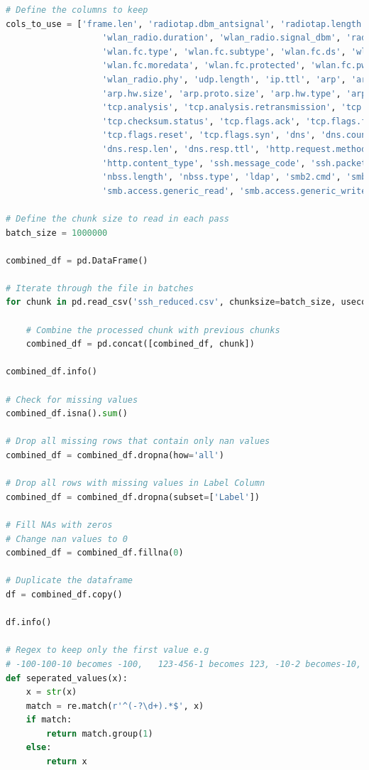 \begin{appendices}
\begin{lstlisting}[language=Python]
# Define the columns to keep
cols_to_use = ['frame.len', 'radiotap.dbm_antsignal', 'radiotap.length', 'wlan.duration',
                   'wlan_radio.duration', 'wlan_radio.signal_dbm', 'radiotap.present.tsft',
                   'wlan.fc.type', 'wlan.fc.subtype', 'wlan.fc.ds', 'wlan.fc.frag',
                   'wlan.fc.moredata', 'wlan.fc.protected', 'wlan.fc.pwrmgt', 'wlan.fc.retry',
                   'wlan_radio.phy', 'udp.length', 'ip.ttl', 'arp', 'arp.proto.type',
                   'arp.hw.size', 'arp.proto.size', 'arp.hw.type', 'arp.opcode',
                   'tcp.analysis', 'tcp.analysis.retransmission', 'tcp.option_len',
                   'tcp.checksum.status', 'tcp.flags.ack', 'tcp.flags.fin', 'tcp.flags.push',
                   'tcp.flags.reset', 'tcp.flags.syn', 'dns', 'dns.count.queries', 'dns.count.answers',
                   'dns.resp.len', 'dns.resp.ttl', 'http.request.method', 'http.response.code',
                   'http.content_type', 'ssh.message_code', 'ssh.packet_length', 'nbns',
                   'nbss.length', 'nbss.type', 'ldap', 'smb2.cmd', 'smb.flags.response',
                   'smb.access.generic_read', 'smb.access.generic_write', 'smb.access.generic_execute','Label']

# Define the chunk size to read in each pass
batch_size = 1000000

combined_df = pd.DataFrame()

# Iterate through the file in batches
for chunk in pd.read_csv('ssh_reduced.csv', chunksize=batch_size, usecols=cols_to_use, low_memory=False):
    
    # Combine the processed chunk with previous chunks
    combined_df = pd.concat([combined_df, chunk])

combined_df.info()

# Check for missing values
combined_df.isna().sum()

# Drop all missing rows that contain only nan values
combined_df = combined_df.dropna(how='all')

# Drop all rows with missing values in Label Column
combined_df = combined_df.dropna(subset=['Label'])

# Fill NAs with zeros
# Change nan values to 0
combined_df = combined_df.fillna(0)

# Duplicate the dataframe
df = combined_df.copy()

df.info()

# Regex to keep only the first value e.g 
# -100-100-10 becomes -100,   123-456-1 becomes 123, -10-2 becomes-10, 81-63-63 becomes 81
def seperated_values(x):
    x = str(x)
    match = re.match(r'^(-?\d+).*$', x)
    if match:
        return match.group(1)
    else:
        return x


\end{lstlisting}
\end{appendices}
